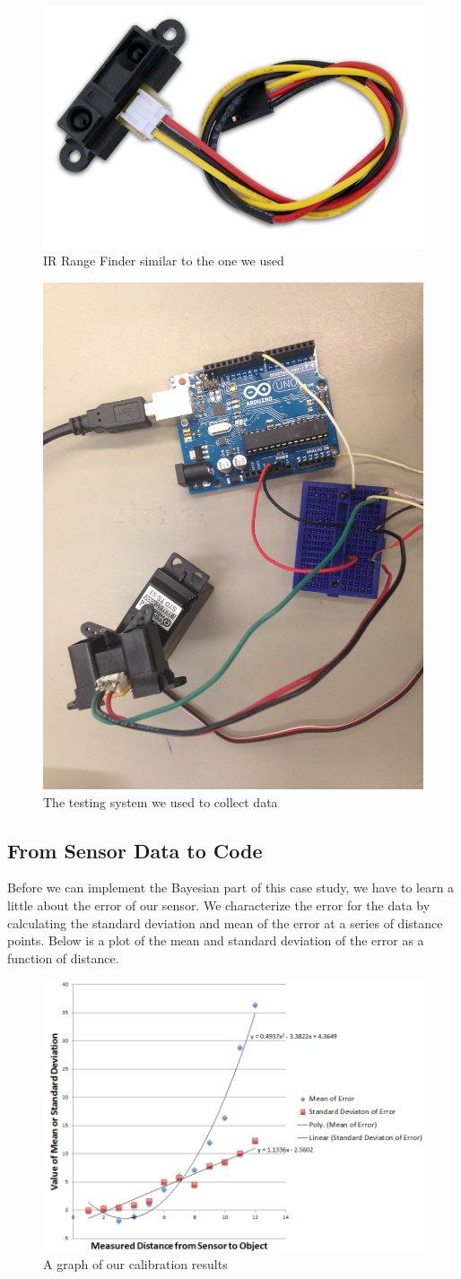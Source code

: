 \documentclass{article}
\begin{document}
\begin{figure}[h!]
\centering
\includegraphics[width=0.3\columnwidth]{IRRANGEFINDER.jpg}
\caption{IR Range Finder similar to the one we used}
\label{fig:rangefinder}
\end{figure}

\begin{figure}[h!]
\centering
\includegraphics[width=0.3\columnwidth]{IMG_0710.JPG}
\caption{The testing system we used to collect data}
\label{fig:rangefinder}
\end{figure}

\subsection{From Sensor Data to Code}
Before we can implement the Bayesian part of this case study, we have to learn a little about the error of our sensor. We characterize the error for the data by calculating the standard deviation and mean of the error at a series of distance points. Below is a plot of the mean and standard deviation of the error as a function of distance.

\begin{figure}[h!]
\centering
\includegraphics[width=0.7\columnwidth]{calibgraph.PNG}
\caption{A graph of our calibration results}
\label{fig:calibgraph}
\end{figure}
\end{document}

